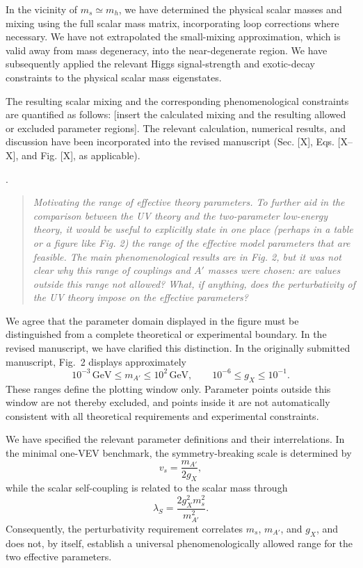 \documentclass[12pt,a4paper]{article}
\begin{document}
In the vicinity of \(m_s \simeq m_h\), we have determined the physical scalar masses and mixing using the full scalar mass matrix, incorporating loop corrections where necessary. We have not extrapolated the small-mixing approximation, which is valid away from mass degeneracy, into the near-degenerate region. We have subsequently applied the relevant Higgs signal-strength and exotic-decay constraints to the physical scalar mass eigenstates.

The resulting scalar mixing and the corresponding phenomenological constraints are quantified as follows: [insert the calculated mixing and the resulting allowed or excluded parameter regions]. The relevant calculation, numerical results, and discussion have been incorporated into the revised manuscript (Sec. [X], Eqs. [X–X], and Fig. [X], as applicable).

\medskip
{}. \begin{quote}\itshape
Motivating the range of effective theory parameters. To further aid in the comparison between the UV theory and the two-parameter low-energy theory, it would be useful to explicitly state in one place (perhaps in a table or a figure like Fig. 2) the range of the effective model parameters that are feasible. The main phenomenological results are in Fig. 2, but it was not clear why this range of couplings and \(A'\) masses were chosen: are values outside this range not allowed? What, if anything, does the perturbativity of the UV theory impose on the effective parameters?\end{quote}

We agree that the parameter domain displayed in the figure must be distinguished from a complete theoretical or experimental boundary. In the revised manuscript, we have clarified this distinction. In the originally submitted manuscript, Fig.~2 displays approximately
\[
10^{-3}\,\mathrm{GeV}\leq m_{A'}\leq10^2\,\mathrm{GeV},
\qquad
10^{-6}\leq g_X\leq10^{-1}.
\]
These ranges define the plotting window only. Parameter points outside this window are not thereby excluded, and points inside it are not automatically consistent with all theoretical requirements and experimental constraints.

We have specified the relevant parameter definitions and their interrelations. In the minimal one-VEV benchmark, the symmetry-breaking scale is determined by
\[
v_s=\frac{m_{A'}}{2g_X},
\]
while the scalar self-coupling is related to the scalar mass through
\[
\lambda_S=\frac{2g_X^2m_s^2}{m_{A'}^2}.
\]
Consequently, the perturbativity requirement correlates \(m_s\), \(m_{A'}\), and \(g_X\), and does not, by itself, establish a universal phenomenologically allowed range for the two effective parameters.
\end{document}
